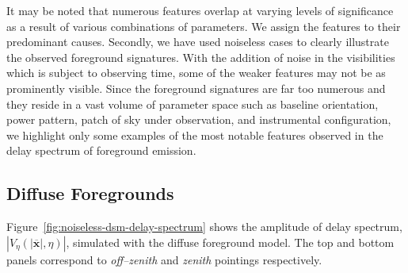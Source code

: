 \documentclass[preprint2,iop,numberedappendix]{emulateapj}
\begin{document}

It may be noted that numerous features overlap at varying levels of significance as a result of various combinations of parameters. We assign the features to their predominant causes. Secondly, we have used noiseless cases to clearly illustrate the observed foreground signatures. With the addition of noise in the visibilities which is subject to observing time, some of the weaker features may not be as prominently visible. Since the foreground signatures are far too numerous and they reside in a vast volume of parameter space such as baseline orientation, power pattern, patch of sky under observation, and instrumental configuration, we highlight only some examples of the most notable features observed in the delay spectrum of foreground emission.

\subsection{Diffuse Foregrounds}\label{sec:diffuse}

Figure~\ref{fig:noiseless-dsm-delay-spectrum} shows the amplitude of delay spectrum, $|V_\eta(|\overline{\mathbf{x}}|,\eta)|$, simulated with the diffuse foreground model. The top and bottom panels correspond to {\it off--zenith} and {\it zenith} pointings respectively. 
\end{document}
